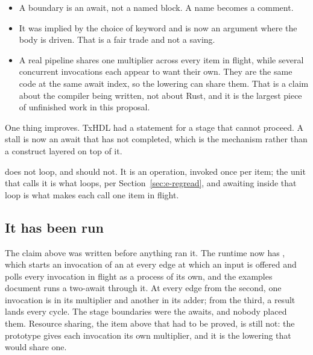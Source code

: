 \begin{itemize}
  \item {} A boundary is an await, not a named
        block. A name becomes a comment.
  \item {} It was
        implied by the choice of keyword and is now an argument where the
        body is driven. That is a fair trade and not a saving.
  \item {} A real pipeline shares
        one multiplier across every item in flight, while several
        concurrent invocations each appear to want their own. They are the
        same code at the same await index, so the lowering can share them.
        That is a claim about the compiler being written, not about Rust,
        and it is the largest piece of unfinished work in this proposal.
\end{itemize}

One thing improves. TxHDL had a  statement for a stage that
cannot proceed. A stall is now an await that has not completed, which is
the mechanism rather than a construct layered on top of it.

 does not loop, and should not. It is an operation, invoked
once per item; the unit that calls it is what loops, per
Section~\ref{sec:e-regread}, and awaiting  inside that loop is
what makes each call one item in flight.

\subsection{It has been run}

The claim above was written before anything ran it. The runtime now
has , which starts an invocation of an
 at every edge at which an input is offered and polls
every invocation in flight as a process of its own, and the examples
document runs a two-await  through it. At every edge from
the second, one invocation is in its multiplier and another in its
adder; from the third, a result lands every cycle. The stage boundaries
were the awaits, and nobody placed them. Resource sharing, the item
above that had to be proved, is still not: the prototype gives each
invocation its own multiplier, and it is the lowering that would share
one.
